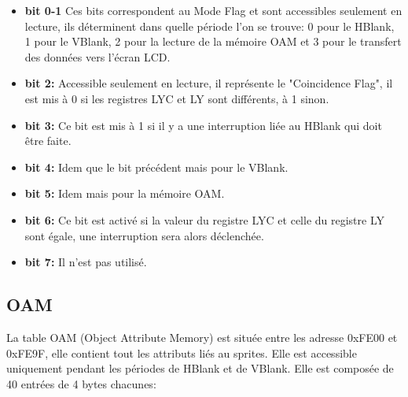 \documentclass{report}
\begin{document}
\begin{itemize}
\item \textbf{bit 0-1}
	Ces bits correspondent au Mode Flag et sont accessibles seulement en lecture, ils déterminent dans quelle période l'on se trouve: 0 pour le HBlank, 1 pour le VBlank, 2 pour la lecture de la mémoire OAM et 3 pour le transfert des données vers l'écran LCD.\\
\item \textbf{bit 2:}
	Accessible seulement en lecture, il représente le "Coincidence Flag", il est mis à 0 si les registres LYC et LY sont différents, à 1 sinon.\\
\item \textbf{bit 3:}
	Ce bit est mis à 1 si il y a une interruption liée au HBlank qui doit être faite.\\
\item \textbf{bit 4:} 
	Idem que le bit précédent mais pour le VBlank.\\
\item \textbf{bit 5:}
	Idem mais pour la mémoire OAM.\\
\item \textbf{bit 6:}
	Ce bit est activé si la valeur du registre LYC et celle du registre LY sont égale, une interruption sera alors déclenchée.\\
\item \textbf{bit 7:}
	Il n'est pas utilisé.\\
\end{itemize}

\subsection{OAM}
	La table OAM (Object Attribute Memory) est située entre les adresse 0xFE00 et 0xFE9F, elle contient tout les attributs liés au sprites. Elle est accessible uniquement pendant les périodes de HBlank et de VBlank. Elle est composée de 40 entrées de 4 bytes chacunes:\\
\end{document}
